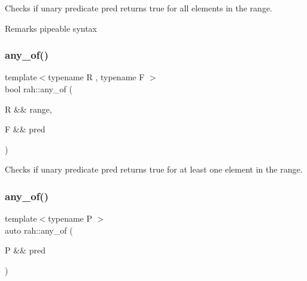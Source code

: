 Checks if unary predicate pred returns true for all elements in the range. 

\begin{DoxyRemark}{Remarks}
pipeable syntax
\end{DoxyRemark}

\begin{DoxyCodeInclude}{0}
\DoxyCodeLine{        ) == \textcolor{keyword}{false});}
\end{DoxyCodeInclude}
\mbox{\label{namespacerah_a836c57da2bd108c491f3ba96786f6aa4}} 
\subsubsection{\texorpdfstring{any\_of()}{any\_of()}\hspace{0.1cm}{\footnotesize\ttfamily [1/2]}}
{\footnotesize\ttfamily template$<$typename R , typename F $>$ \\
bool rah\+::any\+\_\+of (\begin{DoxyParamCaption}\item[{R \&\&}]{range,  }\item[{F \&\&}]{pred }\end{DoxyParamCaption})}



Checks if unary predicate pred returns true for at least one element in the range. 


\begin{DoxyCodeInclude}{0}
\DoxyCodeLine{    );}
\end{DoxyCodeInclude}
\mbox{\label{namespacerah_aa3f330b2354859d8a9e6df794a1e7a1a}} 
\subsubsection{\texorpdfstring{any\_of()}{any\_of()}\hspace{0.1cm}{\footnotesize\ttfamily [2/2]}}
{\footnotesize\ttfamily template$<$typename P $>$ \\
auto rah\+::any\+\_\+of (\begin{DoxyParamCaption}\item[{P \&\&}]{pred }\end{DoxyParamCaption})}



